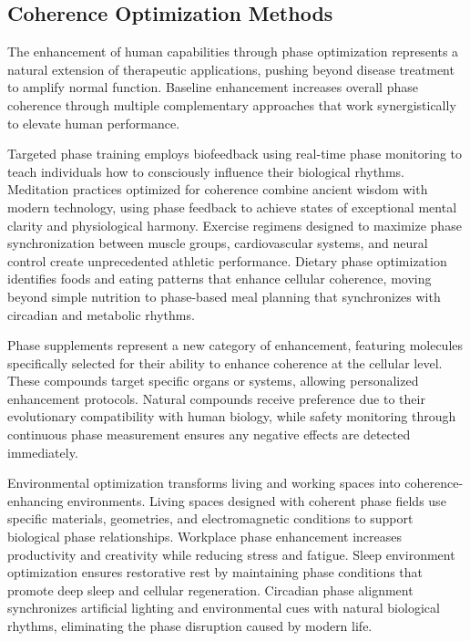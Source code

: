 \documentclass[12pt,a4paper]{report}
\begin{document}
\subsection{Coherence Optimization Methods}

The enhancement of human capabilities through phase optimization represents a natural extension of therapeutic applications, pushing beyond disease treatment to amplify normal function. Baseline enhancement increases overall phase coherence through multiple complementary approaches that work synergistically to elevate human performance.

Targeted phase training employs biofeedback using real-time phase monitoring to teach individuals how to consciously influence their biological rhythms. Meditation practices optimized for coherence combine ancient wisdom with modern technology, using phase feedback to achieve states of exceptional mental clarity and physiological harmony. Exercise regimens designed to maximize phase synchronization between muscle groups, cardiovascular systems, and neural control create unprecedented athletic performance. Dietary phase optimization identifies foods and eating patterns that enhance cellular coherence, moving beyond simple nutrition to phase-based meal planning that synchronizes with circadian and metabolic rhythms.

Phase supplements represent a new category of enhancement, featuring molecules specifically selected for their ability to enhance coherence at the cellular level. These compounds target specific organs or systems, allowing personalized enhancement protocols. Natural compounds receive preference due to their evolutionary compatibility with human biology, while safety monitoring through continuous phase measurement ensures any negative effects are detected immediately.

Environmental optimization transforms living and working spaces into coherence-enhancing environments. Living spaces designed with coherent phase fields use specific materials, geometries, and electromagnetic conditions to support biological phase relationships. Workplace phase enhancement increases productivity and creativity while reducing stress and fatigue. Sleep environment optimization ensures restorative rest by maintaining phase conditions that promote deep sleep and cellular regeneration. Circadian phase alignment synchronizes artificial lighting and environmental cues with natural biological rhythms, eliminating the phase disruption caused by modern life.
\end{document}
